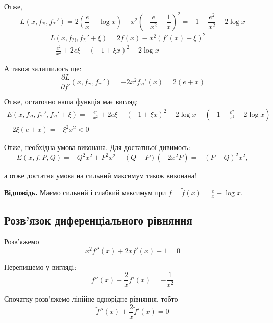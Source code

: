 \documentclass[14pt]{extarticle}
\newcommand{\<}{\langle}
\renewcommand{\>}{\rangle}
\theoremstyle{mystyle}{\newtheorem{definition}{Definition}[section]}
\theoremstyle{mystyle}{\newtheorem{proposition}[definition]{Proposition}}
\theoremstyle{mystyle}{\newtheorem{theorem}[definition]{Theorem}}
\theoremstyle{mystyle}{\newtheorem{lemma}[definition]{Lemma}}
\theoremstyle{mystyle}{\newtheorem{corollary}[definition]{Corollary}}
\theoremstyle{mystyle}{\newtheorem*{remark}{Remark}}
\theoremstyle{mystyle}{\newtheorem*{remarks}{Remarks}}
\theoremstyle{mystyle}{\newtheorem*{example}{Example}}
\theoremstyle{mystyle}{\newtheorem*{examples}{Examples}}
\theoremstyle{definition}{\newtheorem*{exercise}{Exercise}}
\theoremstyle{cstyle}{\newtheorem*{cthm}{}}
\theoremstyle{warn}
\begin{document}
Отже,
\begin{equation}
    L(x,f_{?!},f_{?!}') = 2\left(\frac{e}{x}-\log x\right) - x^2\left(-\frac{e}{x^2}-\frac{1}{x}\right)^2 = -1-\frac{e^2}{x^2}-2\log x
\end{equation}
\begin{gather}
    L(x,f_{?!},f_{?!}'+\xi) = 2f(x)-x^2(f'(x)+\xi)^2 = \nonumber \\
    -\frac{e^2}{x^2} + 2e\xi - (-1+\xi x)^2 - 2\log x
\end{gather}

А також залишилось ще:
\begin{equation}
    \frac{\partial L}{\partial f'}(x,f_{?!},f_{?!}') = -2x^2f_{?!}'(x) = 2(e+x)
\end{equation}

Отже, остаточно наша функція має вигляд:
\begin{gather}
    E(x,f_{?!},f_{?!}',f_{?!}'+\xi) = -\frac{e^2}{x^2} + 2e\xi - (-1+\xi x)^2 - 2\log x - \left(-1-\frac{e^2}{x^2}-2\log x\right) \nonumber \\
    -2\xi(e+x) = -\xi^2x^2 < 0
\end{gather}

Отже, необхідна умова виконана. Для достатньої дивимось:
\begin{equation}
    E(x,f,P,Q) = -Q^2x^2 + P^2x^2 - (Q-P)(-2x^2P) = -(P-Q)^2x^2,
\end{equation}

а отже достатня умова на сильний максимум також виконана!

\textbf{Відповідь.} Маємо сильний і слабкий максимум при $f=\widetilde{f}(x) = \frac{e}{x}-\log x$.

\subsection{Розв'язок диференціального рівняння}

Розв'яжемо
\begin{equation}
    x^2f''(x) + 2xf'(x) + 1 = 0
\end{equation}

Перепишемо у вигляді:
\begin{equation}
    f''(x) + \frac{2}{x}f'(x) = -\frac{1}{x^2}
\end{equation}

Спочатку розв'яжемо лінійне однорідне рівняння, тобто
\begin{equation}
    \widetilde{f}''(x) + \frac{2}{x}\widetilde{f}'(x) = 0
\end{equation}
\end{document}
